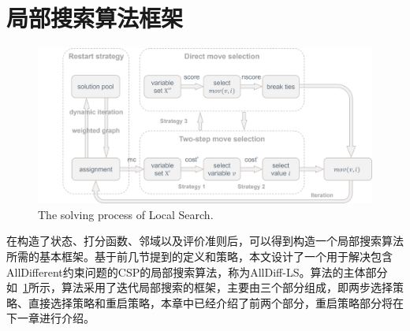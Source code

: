 \section{局部搜索算法框架}

\begin{figure}[]
    \centering
    \includegraphics[width=\columnwidth]{Img/total.png}
     {The solving process of Local Search.}
    \label{fig:acls}
\end{figure}

在构造了状态、打分函数、邻域以及评价准则后，可以得到构造一个局部搜索算法所需的基本框架。基于前几节提到的定义和策略，本文设计了一个用于解决包含AllDifferent约束问题的CSP的局部搜索算法，称为AllDiff-LS。算法的主体部分如\figurename~\ref{fig:acls}所示，算法采用了迭代局部搜索的框架，主要由三个部分组成，即两步选择策略、直接选择策略和重启策略，本章中已经介绍了前两个部分，重启策略部分将在下一章进行介绍。

